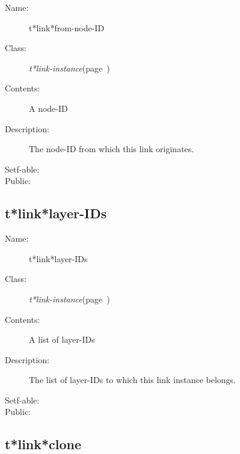 \begin{description}
\item [Name:]  t*link*from-node-ID

\item [Class:] {\sl t*link-instance}\hfill(page~\pageref{t*link-instance})

\item [Contents:] 
A node-ID

\item [Description:]

The node-ID from which this link originates.

\item [Setf-able:]


\item [Public:]



\end{description}
\horizontalline

\subsection{t*link*layer-IDs}
\label{t*link*layer-IDs}

\begin{description}
\item [Name:]  t*link*layer-IDs

\item [Class:] {\sl t*link-instance}\hfill(page~\pageref{t*link-instance})

\item [Contents:] A list of layer-IDs

\item [Description:]

The list of layer-IDs to which this link instance belongs.

\item [Setf-able:]


\item [Public:]



\end{description}
\horizontalline

\subsection{t*link*clone}
\label{t*link*clone}

